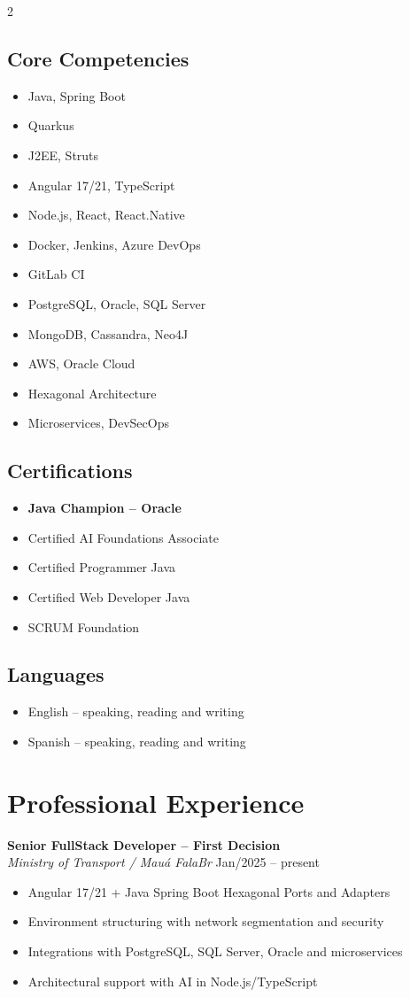 \documentclass[a4paper,11pt]{article}
\newcommand{\sectionleft}[1]{\subsection*{#1}}
\newcommand{\sectionright}[1]{\section*{#1}}
\begin{document}
\begin{paracol}{2}

\sectionleft{Core Competencies}
\begin{itemize}
    \item Java, Spring Boot
    \item Quarkus
    \item J2EE, Struts
    \item Angular 17/21, TypeScript
    \item Node.js, React, React.Native
    \item Docker, Jenkins, Azure DevOps
    \item GitLab CI
    \item PostgreSQL, Oracle, SQL Server
    \item MongoDB, Cassandra, Neo4J
    \item AWS, Oracle Cloud
    \item Hexagonal Architecture
    \item Microservices, DevSecOps
\end{itemize}

\vspace{4pt}
\sectionleft{Certifications}
\begin{itemize}
    \item \textbf{Java Champion – Oracle}
    \item Certified AI Foundations Associate
    \item Certified Programmer Java
    \item Certified Web Developer Java
    \item SCRUM Foundation
\end{itemize}

\vspace{4pt}
\sectionleft{Languages}
\begin{itemize}
    \item English – speaking, reading and writing
    \item Spanish – speaking, reading and writing
\end{itemize}

\switchcolumn

\sectionright{Professional Experience}

\textbf{Senior FullStack Developer – First Decision} \\
\textit{Ministry of Transport / Mauá FalaBr}
\hfill Jan/2025 – present
\begin{itemize}
    \item Angular 17/21 + Java Spring Boot Hexagonal Ports and Adapters
    \item Environment structuring with network segmentation and security
    \item Integrations with PostgreSQL, SQL Server, Oracle and microservices
    \item Architectural support with AI in Node.js/TypeScript
\end{itemize}


\end{paracol}
\end{document}
